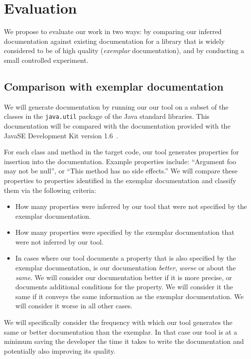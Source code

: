 \section{Evaluation}

We propose to evaluate our work in two ways: by comparing our inferred
documentation against existing documentation for a library that is widely
considered to be of high quality (\textit{exemplar} documentation), and by
conducting a small controlled experiment.

\subsection{Comparison with exemplar documentation}

We will generate documentation by running our our tool on a subset of the
classes in the \texttt{java.util} package of the Java standard libraries. This
documentation will be compared with the documentation provided with the
Java\texttrademark SE Development Kit version 1.6~\cite{JDK6}.

For each class and method in the target code, our tool generates properties for
insertion into the documentation. Example properties include: ``Argument foo
may not be null'', or ``This method has no side effects.'' We will compare
these properties to properties identified in the exemplar documentation and
classify them via the following criteria:

\begin{itemize}
\item How many properties were inferred by our tool that were not specified by
  the exemplar documentation.
\item How many properties were specified by the exemplar documentation that
  were not inferred by our tool.
\item In cases where our tool documents a property that is also specified by
  the exemplar documentation, is our documentation \textit{better},
  \textit{worse} or about the \textit{same}. We will consider our documentation
  better if it is more precise, or documents additional conditions for the
  property. We will consider it the same if it conveys the same information as
  the exemplar documentation. We will consider it worse in all other cases.
\end{itemize}

We will specifically consider the frequency with which our tool generates the
same or better documentation than the exemplar. In that case our tool is at a
minimum saving the developer the time it takes to write the documentation and
potentially also improving its quality.

